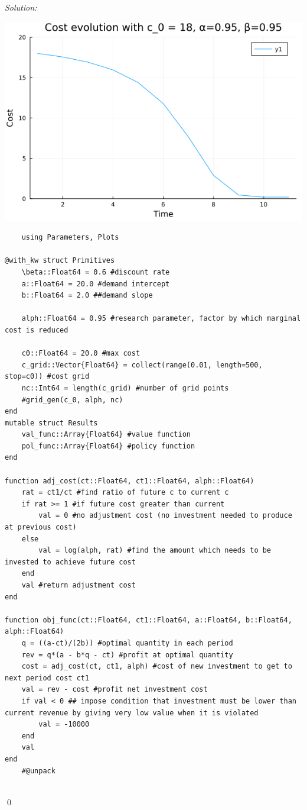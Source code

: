 \documentclass[12pt]{article}
\newenvironment{sol}
           {\emph{Solution:}
           }
           {
           \qed
           }
\begin{document}
\begin{sol}
\begin{center}
            \includegraphics[scale=0.6]{costevol95}
        \end{center}
        \begin{lstlisting}
    using Parameters, Plots

@with_kw struct Primitives
    \beta::Float64 = 0.6 #discount rate
    a::Float64 = 20.0 #demand intercept
    b::Float64 = 2.0 ##demand slope

    alph::Float64 = 0.95 #research parameter, factor by which marginal cost is reduced

    c0::Float64 = 20.0 #max cost    
    c_grid::Vector{Float64} = collect(range(0.01, length=500, stop=c0)) #cost grid
    nc::Int64 = length(c_grid) #number of grid points
    #grid_gen(c_0, alph, nc)
end
mutable struct Results
    val_func::Array{Float64} #value function
    pol_func::Array{Float64} #policy function
end

function adj_cost(ct::Float64, ct1::Float64, alph::Float64)
    rat = ct1/ct #find ratio of future c to current c
    if rat >= 1 #if future cost greater than current
        val = 0 #no adjustment cost (no investment needed to produce at previous cost)
    else
        val = log(alph, rat) #find the amount which needs to be invested to achieve future cost
    end
    val #return adjustment cost
end

function obj_func(ct::Float64, ct1::Float64, a::Float64, b::Float64, alph::Float64)
    q = ((a-ct)/(2b)) #optimal quantity in each period
    rev = q*(a - b*q - ct) #profit at optimal quantity
    cost = adj_cost(ct, ct1, alph) #cost of new investment to get to next period cost ct1
    val = rev - cost #profit net investment cost
    if val < 0 ## impose condition that investment must be lower than current revenue by giving very low value when it is violated
        val = -10000
    end
    val
end
    #@unpack 


\end{lstlisting}
\end{sol}
\end{document}
